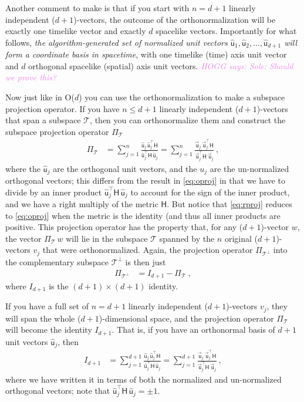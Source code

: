 \documentclass{article}
\newcommand{\metric}{\mathsf{H}}
\newcommand{\proj}{\mathsf{\Pi}}
\newcommand\upvec[1]{\!\vec{\,\mathrm{#1}}}
\newcommand{\Lvec}[1]{\upvec{\mathsf{#1}}} %
\newcommand{\Lhat}[1]{\hat{\mathsf{#1}}} %
\newcommand{\plus}{\!+\!} %
\newcommand{\HOGG}[1]{\textcolor{violet}{\textsl{HOGG says: {#1}}}}
\begin{document}
Another comment to make is that if you start with $n=d+1$ linearly independent ($d\plus1$)-vectors, the outcome of the orthonormalization will be exactly one timelike vector and exactly $d$ spacelike vectors.
Importantly for what follows, \emph{the algorithm-generated set of normalized unit vectors $\Lhat{u}_1,\Lhat{u}_2,\ldots,\Lhat{u}_{d+1}$ will form a coordinate basis in spacetime}, with one timelike (time) axis unit vector and $d$ orthogonal spacelike (spatial) axis unit vectors.
\HOGG{Sole: Should we prove this?}

Now just like in O($d$) you can use the orthonormalization to make a subspace projection operator.
If you have $n\leq d+1$ linearly independent ($d\plus1$)-vectors that span a subspace $\mathscr{T}$, then you can orthonormalize them and construct the subspace projection operator $\proj_\mathscr{T}$
\begin{align}\label{eq:rproj}
    \proj_\mathscr{T} &= \sum_{j=1}^n \frac{\Lhat{u}_j\,\Lhat{u}_j^\top\metric}{\Lhat{u}_j^\top\metric\,\Lhat{u}_j} = \sum_{j=1}^n \frac{\Lvec{u}_j\,\Lvec{u}_j^\top\metric}{\Lvec{u}_j^\top\metric\,\Lvec{u}_j} ~,
\end{align}
where the $\Lhat{u}_j$ are the orthogonal unit vectors, and the $u_j$ are the un-normalized orthogonal vectors; this differs from the result in \eqref{eq:oproj} in that we have to divide by an inner product $\Lhat{u}_j^\top\metric\,\Lhat{u}_j$ to account for the sign of the inner product, and we have a right multiply of the metric $\metric$.
But notice that \eqref{eq:rproj} reduces to \eqref{eq:oproj} when the metric is the identity (and thus all inner products are positive.
This projection operator has the property that, for any ($d\plus1$)-vector $w$, the vector $\proj_\mathscr{T}\,w$ will lie in the subspace $\mathscr{T}$ spanned by the $n$ original ($d\plus1$)-vectors $v_j$ that were orthonormalized.
Again, the projection operator $\proj_{\mathscr{T}^\perp}$ into the complementary subspace $\mathscr{T}^\perp$ is then just
\begin{align}\label{eq:lprojcomp}
    \proj_{\mathscr{T}^\perp} &= I_{d+1} - \proj_\mathscr{T} ~,
\end{align}
where $I_{d+1}$ is the $(d+1)\times(d+1)$ identity.

If you have a full set of $n=d+1$ linearly independent ($d\plus1$)-vectors $v_j$, they will span the whole ($d\plus1$)-dimensional space, and the projection operator $\proj_\mathscr{T}$ will become the identity $I_{d+1}$.
That is, if you have an orthonormal basis of $d+1$ unit vectors $\Lhat{u}_j$, then
\begin{align}
    I_{d+1} &= \sum_{j=1}^{d+1} \frac{\Lhat{u}_j\,\Lhat{u}_j^\top\metric}{\Lhat{u}_j^\top\metric\,\Lhat{u}_j} = \sum_{j=1}^{d+1} \frac{\Lvec{u}_j\,\Lvec{u}_j^\top\metric}{\Lvec{u}_j^\top\metric\,\Lvec{u}_j} \label{eq:Lidentity} ~,
\end{align}
where we have written it in terms of both the normalized and un-normalized orthogonal vectors; note that $\Lhat{u}_j^\top\metric\,\Lhat{u}_j=\pm 1$.
\end{document}
